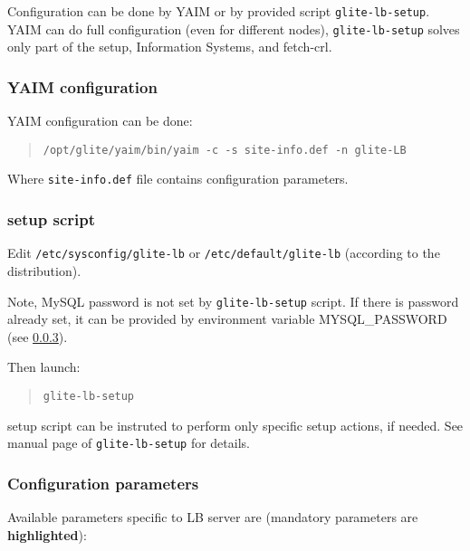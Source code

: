Configuration can be done by YAIM or by provided script \texttt{glite-lb-setup}. YAIM can do full configuration (even for different nodes), \texttt{glite-lb-setup} solves only \LB part of the setup, Information Systems, and fetch-crl.

\subsubsection{YAIM configuration}

YAIM configuration can be done:

\begin{quote}
\texttt{/opt/glite/yaim/bin/yaim -c -s site-info.def -n glite-LB}
\end{quote}

Where \texttt{site-info.def} file contains configuration parameters.

\subsubsection{\LB setup script}

Edit \texttt{/etc/sysconfig/glite-lb} or \texttt{/etc/default/glite-lb} (according to the distribution).

Note, MySQL password is not set by \texttt{glite-lb-setup} script. If there is password already set, it can be provided by environment variable MYSQL\_PASSWORD (see \ref{inst:parameters}).

Then launch:
\begin{quote}
\texttt{glite-lb-setup}
\end{quote}

\LB setup script can be instruted to perform only specific setup actions, if needed. See manual page of \texttt{glite-lb-setup} for details.

\subsubsection{Configuration parameters}
\label{inst:parameters}

Available parameters specific to LB server are (mandatory parameters are \textbf{highlighted}):

